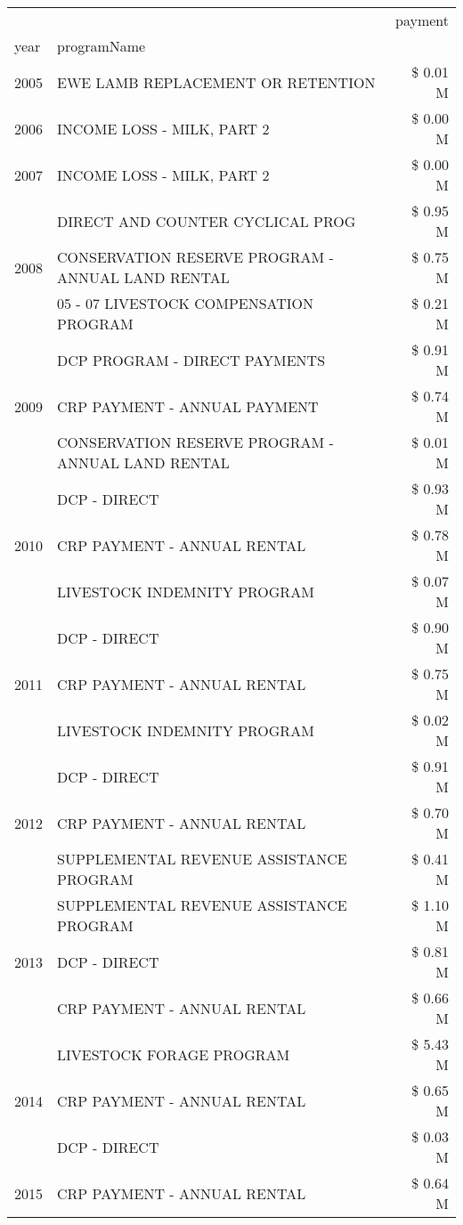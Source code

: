 \begin{tabular}{llr}
\toprule
 &  & payment \\
year & programName &  \\
\midrule
2005 & EWE LAMB REPLACEMENT OR RETENTION & \$ 0.01 M \\
\cline{1-3}
2006 & INCOME LOSS - MILK, PART 2 & \$ 0.00 M \\
\cline{1-3}
2007 & INCOME LOSS - MILK, PART 2 & \$ 0.00 M \\
\cline{1-3}
\multirow[t]{3}{*}{2008} & DIRECT AND COUNTER CYCLICAL PROG & \$ 0.95 M \\
 & CONSERVATION RESERVE PROGRAM - ANNUAL LAND RENTAL & \$ 0.75 M \\
 & 05 - 07 LIVESTOCK COMPENSATION PROGRAM & \$ 0.21 M \\
\cline{1-3}
\multirow[t]{3}{*}{2009} & DCP PROGRAM - DIRECT PAYMENTS & \$ 0.91 M \\
 & CRP PAYMENT - ANNUAL PAYMENT & \$ 0.74 M \\
 & CONSERVATION RESERVE PROGRAM - ANNUAL LAND RENTAL & \$ 0.01 M \\
\cline{1-3}
\multirow[t]{3}{*}{2010} & DCP - DIRECT & \$ 0.93 M \\
 & CRP PAYMENT - ANNUAL RENTAL & \$ 0.78 M \\
 & LIVESTOCK INDEMNITY PROGRAM & \$ 0.07 M \\
\cline{1-3}
\multirow[t]{3}{*}{2011} & DCP - DIRECT & \$ 0.90 M \\
 & CRP PAYMENT - ANNUAL RENTAL & \$ 0.75 M \\
 & LIVESTOCK INDEMNITY PROGRAM & \$ 0.02 M \\
\cline{1-3}
\multirow[t]{3}{*}{2012} & DCP - DIRECT & \$ 0.91 M \\
 & CRP PAYMENT - ANNUAL RENTAL & \$ 0.70 M \\
 & SUPPLEMENTAL REVENUE ASSISTANCE PROGRAM & \$ 0.41 M \\
\cline{1-3}
\multirow[t]{3}{*}{2013} & SUPPLEMENTAL REVENUE ASSISTANCE PROGRAM & \$ 1.10 M \\
 & DCP - DIRECT & \$ 0.81 M \\
 & CRP PAYMENT - ANNUAL RENTAL & \$ 0.66 M \\
\cline{1-3}
\multirow[t]{3}{*}{2014} & LIVESTOCK FORAGE PROGRAM & \$ 5.43 M \\
 & CRP PAYMENT - ANNUAL RENTAL & \$ 0.65 M \\
 & DCP - DIRECT & \$ 0.03 M \\
\cline{1-3}
\multirow[t]{3}{*}{2015} & CRP PAYMENT - ANNUAL RENTAL & \$ 0.64 M \\

\end{tabular}
